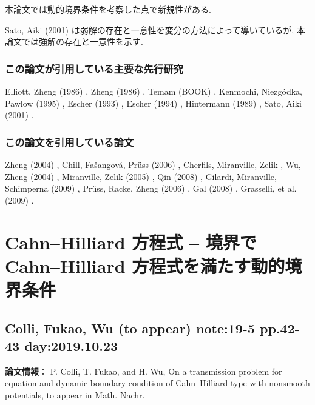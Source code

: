 \documentclass[openary, a4paper, oneside]{jsarticle}
\begin{document}
		本論文では動的境界条件を考察した点で新規性がある.

		Sato, Aiki (2001) \cite{SatoAiki2001} は弱解の存在と一意性を変分の方法によって導いているが, 本論文では強解の存在と一意性を示す.
	\subsubsection{この論文が引用している主要な先行研究}
		Elliott, Zheng (1986) \cite{ElliottZheng1986}, Zheng (1986) \cite{Zheng1986}, Temam (BOOK) \cite{TemamBOOK}, Kenmochi, Niezg\'odka, Pawlow (1995) \cite{KenmochiNiezgodkaPawlow1995}, Escher (1993) \cite{Escher1993}, Escher (1994) \cite{Escher1994}, Hintermann (1989) \cite{Hintermann1989}, Sato, Aiki (2001) \cite{SatoAiki2001}.
	\subsubsection{この論文を引用している論文}
		Zheng (2004) \cite{ZhengBOOK}, Chill, Fa\v{s}angov\'a, Pr\"uss (2006) \cite{ChillETAL2006}, Cherfils, Miranville, Zelik \cite{CherfilsMiranvilleZelik2011}, Wu, Zheng (2004) \cite{WuZheng2004}, Miranville, Zelik (2005) \cite{MiranvilleZelik2005}, Qin (2008) \cite{QinBOOK}, Gilardi, Miranville, Schimperna (2009) \cite{GilardiMiranvilleSchimperna2009}, Pr\"uss, Racke, Zheng (2006) \cite{PrussRackeZheng2006}, Gal (2008) \cite{GalGrasselli2008}, Grasselli, et al. (2009) \cite{GrasselliSchimpernaSegattiZelik2009}.

\newpage

\section{Cahn--Hilliard 方程式 -- 境界で Cahn--Hilliard 方程式を満たす動的境界条件}

\subsection{Colli, Fukao, Wu (to appear) \cite{ColliFukaoWu2020} note:19-5 pp.42-43 day:2019.10.23}
{\bf 論文情報}：
P. Colli, T. Fukao, and H. Wu, On a transmission problem for equation and dynamic boundary condition of Cahn–Hilliard type with nonsmooth potentials, to appear in Math. Nachr.
\end{document}
